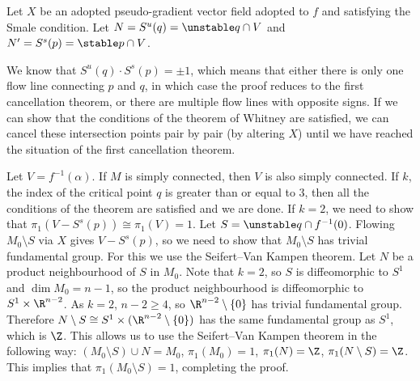 \begin{myproof}
    Let $X$ be an adopted pseudo-gradient vector field adopted to  $f$ and satisfying the Smale condition.
    Let $N = S^{u}(q) = \unstable q \cap V$ and $N' = S^{s}(p) = \stable p \cap  V$.

    We know that $S^{u}(q) \cdot S^{s}(p) = \pm 1$, which means that either there is only one flow line connecting $p$ and  $q$, in which case the proof reduces to the first cancellation theorem, or there are multiple flow lines with opposite signs.
    If we can show that the conditions of the theorem of Whitney are satisfied, we can cancel these intersection points pair by pair (by altering $X$) until we have reached the situation of the first cancellation theorem.

    Let $V = f^{-1}(\alpha)$.  If $M$ is simply connected, then $V$ is also simply connected.
    If $k$, the index of the critical point $q$ is greater than or equal to $3$, then all the conditions of the theorem are satisfied and we are done.
    If $k = 2$, we need to show that  $\pi_1(V - S^{s}(p)) \cong \pi_1(V) = 1$.
    Let $S = \unstable q \cap f^{-1}(0)$.
    Flowing $M_0 \setminus S$ via $X$ gives  $V - S^{s}(p)$, so we need to show that $M_0 \setminus S$ has trivial fundamental group.
    For this we use the Seifert--Van Kampen theorem. Let $N$ be a product neighbourhood of $S$ in $M_0$.
    Note that $k=2$, so $S$ is diffeomorphic to $S^{1}$ and $\dim M_0 = n-1$, so the product neighbourhood is diffeomorphic to $ S^1 \times \R^{n-2}$.
    As $k=2$, $n - 2 \ge 4$, so $\R^{n-2} \setminus \{ 0 \} $ has trivial fundamental group. Therefore $N \setminus S \cong S^{1} \times (\R^{n-2}\setminus \{0\})$ has the same fundamental group as $S^{1}$, which is $\Z$.
    This allows us to use the Seifert--Van Kampen theorem in the following way:
    $(M_0 \setminus S) \cup N = M_0$, $\pi_1(M_0) = 1$,  $\pi_1(N) = \Z$,  $\pi_1(N \setminus S) = \Z$. This implies that $\pi_1(M_0 \setminus S) = 1$, completing the proof.
\end{myproof}

